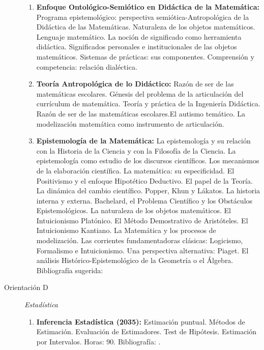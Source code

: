 \documentclass[a4paper, 12pt]{article}
\begin{document}
\begin{description}
\begin{enumerate}
\item\textbf{Enfoque Ontológico-Semiótico en Didáctica de la
Matemática:} Programa epistemológico: perspectiva
semiótica-Antropológica de la Di\-dáctica de las Matemáticas.
Naturaleza de los objetos matemáticos. Lenguaje matemático. La
noción de significado como herramienta di\-dáctica. Significados
personales e institucionales de las objetos mate\-máticos.
Sistemas de prácticas: sus componentes. Comprensión y competencia:
relación dialéctica.

\item\textbf{Teoría Antropológica de lo Didáctico:} Razón de ser  de las
matemáti\-cas escolares. Génesis del problema de la articulación
del currículum de matemática. Teoría y práctica de la Ingeniería
Didáctica. Razón de ser  de las matemáticas escolares.El autismo
temático. La modelización matemática como instrumento de
articulación. 
\item\textbf{Epistemología de la Matemática:}
La epistemología y su relación con la Historia de la Ciencia  y
con la Filosofía de la Ciencia. La epistemología como estudio de
los discursos científicos. Los mecanismos de la elaboración
científica. La matemática: su especificidad. El Positivismo y el
enfoque Hipotético Deductivo. El papel de la Teoría. La dinámica
del cambio científico. Popper, Khun y Lákatos. La historia interna
y externa. Bachelard, el Problema Científico y los Obstáculos
Epistemológicos. La naturaleza de los objetos matemáticos. El
Intuicionismo Platónico. El Método Demostrativo de Aristóteles. El
Intuicionismo Kantiano. La Matemática y los procesos de
mo\-delización. Las corrientes fundamentadoras clásicas:
Logicismo, Formalismo e Intuicionismo. Una perspectiva
alternativa: Piaget. El análisis Histórico-Epistemológico de la
Geometría o el Álgebra. Bibliografía sugerida: \cite{johshua,
klimo1,klimo2}




\end{enumerate}





\item[Orientación D]\emph{Estadística}
\begin{enumerate}



\item\textbf{ Inferencia Estadística (2035):} Estimación puntual. Métodos de Estimación.
Evaluación de Estimadores. Test de Hipótesis. Estimación por
Intervalos. Horas: 90. Bibliografía: \cite{steven,bickel,casella,  rohatgi}.



\end{enumerate}
\end{description}
\end{document}
